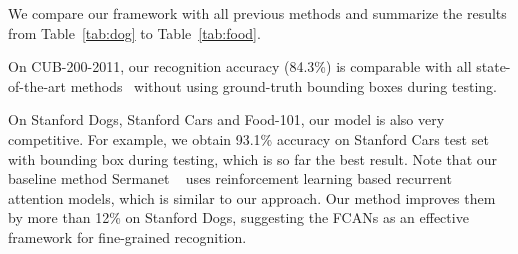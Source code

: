 \documentclass[10pt,twocolumn,letterpaper]{article}
\begin{document}
We compare our framework with all previous methods and summarize the results from Table~\ref{tab:dog} to Table~\ref{tab:food}.

On CUB-200-2011, our recognition accuracy (84.3\%) is comparable with all state-of-the-art methods~\cite{lin2015bilinear, jaderberg2015spatial, kong2016low} without using ground-truth bounding boxes during testing.



On Stanford Dogs, Stanford Cars and Food-101, our model is also very competitive.
For example, we obtain 93.1\% accuracy on Stanford Cars test set with bounding box during testing, which is so far the best result.
Note that our baseline method Sermanet \etal~\cite{sermanet2014attention} uses reinforcement learning based recurrent attention models, which is similar to our approach.
Our method improves them by more than 12\% on Stanford Dogs, suggesting the FCANs as an effective framework for fine-grained recognition.
\end{document}
